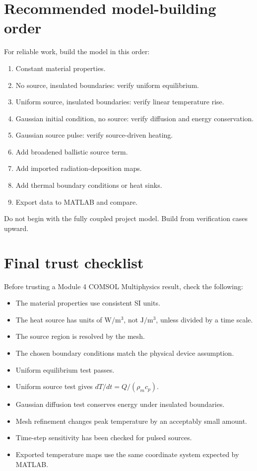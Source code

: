 \documentclass[11pt]{article}
\newcommand{\COMSOL}{COMSOL Multiphysics}
\newcommand{\comsol}{\COMSOL}
\newcommand{\module}{Module 4}
\begin{document}
\section{Recommended model-building order}

For reliable work, build the model in this order:
\begin{enumerate}
\item Constant material properties.
\item No source, insulated boundaries: verify uniform equilibrium.
\item Uniform source, insulated boundaries: verify linear temperature rise.
\item Gaussian initial condition, no source: verify diffusion and energy conservation.
\item Gaussian source pulse: verify source-driven heating.
\item Add broadened ballistic source term.
\item Add imported radiation-deposition maps.
\item Add thermal boundary conditions or heat sinks.
\item Export data to MATLAB and compare.
\end{enumerate}

Do not begin with the fully coupled project model.  Build from verification cases upward.

\section{Final trust checklist}

Before trusting a \module{} \comsol{} result, check the following:
\begin{itemize}
\item The material properties use consistent SI units.
\item The heat source has units of \(\mathrm{W/m^3}\), not \(\mathrm{J/m^3}\), unless divided by a time scale.
\item The source region is resolved by the mesh.
\item The chosen boundary conditions match the physical device assumption.
\item Uniform equilibrium test passes.
\item Uniform source test gives \(dT/dt=Q/(\rho_m c_p)\).
\item Gaussian diffusion test conserves energy under insulated boundaries.
\item Mesh refinement changes peak temperature by an acceptably small amount.
\item Time-step sensitivity has been checked for pulsed sources.
\item Exported temperature maps use the same coordinate system expected by MATLAB.
\end{itemize}
\end{document}
